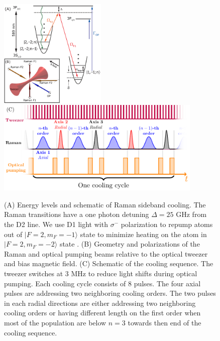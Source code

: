 \documentclass[aps,prl,twocolumn,groupedaddress]{revtex4-1}
\begin{document}
\begin{figure}
  \includegraphics[height=5.2cm]{imgs/Na_RSC_schematic.pdf}
  \includegraphics[height=4.5cm]{sequence.pdf}
  \caption{(A) Energy levels and schematic of Raman sideband cooling.
    The Raman transitions have a one photon detuning $\Delta=25$ GHz from the D2 line.
    We use D1 light with $\sigma^-$ polarization to repump atoms out of $|F=2,m_F=-1\rangle$
    state to minimize heating on the atom in $|F=2,m_F=-2\rangle$ state
    .
    (B) Geometry and polarizations of the Raman and optical pumping beams relative to the
    optical tweezer and bias magnetic field.
    (C) Schematic of the cooling sequence. The tweezer switches at 3 MHz to
    reduce light shifts during optical pumping. Each cooling cycle consists of $8$ pulses.
    The four axial pulses are addressing two neighboring cooling orders.
    The two pulses in each radial directions are either addressing two neighboring cooling orders
    or having different length on the first order when most of the population are below $n=3$
    towards then end of the cooling sequence.
    \label{f-setup}}
\end{figure}
\end{document}
